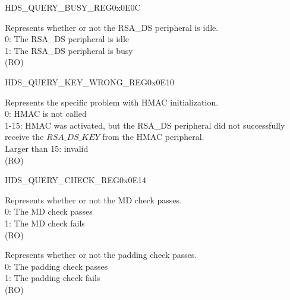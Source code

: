 \begin{register}{H}{DS\_QUERY\_BUSY\_REG}{0x0E0C}\label{regdesc:DSQUERYBUSYREG}
%
%
\regnewline%
\begin{regdesc}\begin{reglist}
\label{fielddesc:DSQUERYBUSY}\item [DS\_QUERY\_BUSY] Represents whether or not the RSA\_DS peripheral is idle.\\
0: The RSA\_DS peripheral is idle\\
1: The RSA\_DS peripheral is busy\\ (RO)
\end{reglist}\end{regdesc}
\end{register}


\begin{register}{H}{DS\_QUERY\_KEY\_WRONG\_REG}{0x0E10}\label{regdesc:DSQUERYKEYWRONGREG}
%
%
\regnewline%
\begin{regdesc}\begin{reglist}
\label{fielddesc:DSQUERYKEYWRONG}\item [DS\_QUERY\_KEY\_WRONG] Represents the specific problem with HMAC initialization.\\
0: HMAC is not called\\
1-15: HMAC was activated, but the RSA\_DS peripheral did not successfully receive the \begin{math}RSA\_DS\_KEY\end{math} from the HMAC peripheral.\\
Larger than 15: invalid\\
(RO)
\end{reglist}\end{regdesc}
\end{register}


\begin{register}{H}{DS\_QUERY\_CHECK\_REG}{0x0E14}\label{regdesc:DSQUERYCHECKREG}
%
%
%
\regnewline%
\begin{regdesc}\begin{reglist}
\label{fielddesc:DSMDERROR}\item [DS\_MD\_ERROR] Represents whether or not the MD check passes.\\
0: The MD check passes\\
1: The MD check fails\\
(RO)
\label{fielddesc:DSPADDINGBAD}\item [DS\_PADDING\_BAD] Represents whether or not the padding check passes.\\
0: The padding check passes\\
1: The padding check fails\\
(RO)
\end{reglist}\end{regdesc}
\end{register}


